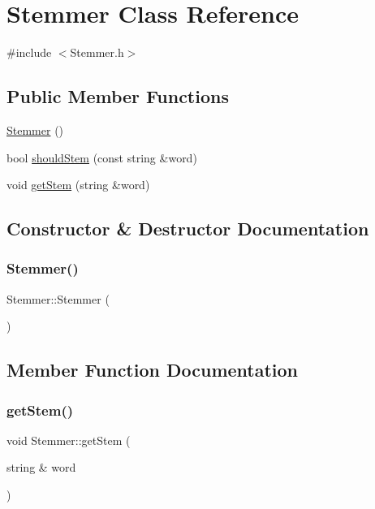 \hypertarget{class_stemmer}{}\section{Stemmer Class Reference}
\label{class_stemmer}


{\ttfamily \#include $<$Stemmer.\+h$>$}

\subsection*{Public Member Functions}
\begin{DoxyCompactItemize}
\item 
\hyperlink{class_stemmer_a4c62e1b5db250ddf432bf9dac580d7fe}{Stemmer} ()
\item 
bool \hyperlink{class_stemmer_a7f617d3eda7515b21e88a7d585da0713}{should\+Stem} (const string \&word)
\item 
void \hyperlink{class_stemmer_a14db39ae0694dadfa04aa8bdb7cadb11}{get\+Stem} (string \&word)
\end{DoxyCompactItemize}


\subsection{Constructor \& Destructor Documentation}
\mbox{\label{class_stemmer_a4c62e1b5db250ddf432bf9dac580d7fe}} 
\subsubsection{\texorpdfstring{Stemmer()}{Stemmer()}}
{\footnotesize\ttfamily Stemmer\+::\+Stemmer (\begin{DoxyParamCaption}{ }\end{DoxyParamCaption})}



\subsection{Member Function Documentation}
\mbox{\label{class_stemmer_a14db39ae0694dadfa04aa8bdb7cadb11}} 
\subsubsection{\texorpdfstring{get\+Stem()}{getStem()}}
{\footnotesize\ttfamily void Stemmer\+::get\+Stem (\begin{DoxyParamCaption}\item[{string \&}]{word }\end{DoxyParamCaption})}

